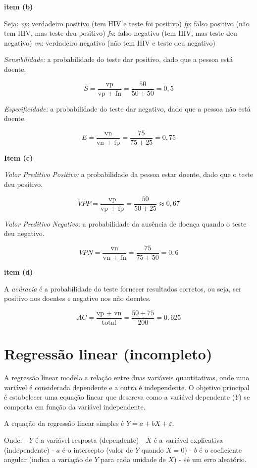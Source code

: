 \documentclass[
]{book}
\begin{document}
\textbf{item (b)}

Seja:
\emph{vp}: verdadeiro positivo (tem HIV e teste foi positivo)
\emph{fp}: falso positivo (não tem HIV, mas teste deu positivo)
\emph{fn}: falso negativo (tem HIV, mas teste deu negativo)
\emph{vn}: verdadeiro negativo (não tem HIV e teste deu negativo)

\emph{Sensibilidade:} a probabilidade do teste dar positivo, dado que a pessoa está doente.

\[
S = \frac{\text{vp}}{\text{vp + fn}} = \frac{50}{50 + 50} = 0,5
\]

\emph{Especificidade:} a probabilidade do teste dar negativo, dado que a pessoa não está doente.

\[
E = \frac{\text{vn}}{\text{vn + fp}} = \frac{75}{75+25} = 0,75
\]

\textbf{Item (c)}

\emph{Valor Preditivo Positivo:} a probabilidade da pessoa estar doente, dado que o teste deu positivo.

\[
VPP = \frac{\text{vp}}{\text{vp + fp}} = \frac{50}{50+25} \approx 0,67
\]

\emph{Valor Preditivo Negativo:} a probabilidade da ausência de doença quando o teste deu negativo.

\[
VPN = \frac{\text{vn}}{\text{vn + fn}} = \frac{75}{75+50} = 0,6
\]

\textbf{item (d)}

A \emph{acúracia} é a probabilidade do teste fornecer resultados corretos, ou seja, ser positivo nos doentes e negativo nos não doentes.

\[
AC = \frac{\text{vp + vn}}{\text{total}} = \frac{50 +75}{200} = 0,625
\]

\chapter{Regressão linear (incompleto)}\label{regressuxe3o-linear-incompleto}

A regressão linear modela a relação entre duas variáveis quantitativas, onde uma variável é considerada dependente e a outra é independente. O objetivo principal é estabelecer uma equação linear que descreva como a variável dependente (\(Y\)) se comporta em função da variável independente.

A equação da regressão linear simples é \(Y = a + b X + \varepsilon\).

Onde:
- \(Y\) é a variável resposta (dependente)
- \(X\) é a variável explicativa (independente)
- \(a\) é o intercepto (valor de \(Y\) quando \(X = 0\))
- \(b\) é o coeficiente angular (indica a variação de \(Y\) para cada unidade de \(X\))
- \(\varepsilon\)é um erro aleatório.
\end{document}
